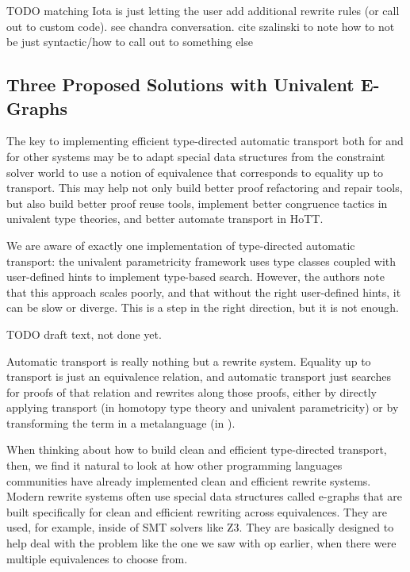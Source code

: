 TODO matching Iota is just letting the user add additional rewrite rules (or call out to custom code).
see chandra conversation.
cite szalinski to note how to not be just syntactic/how to call out to something else

\subsection{Three Proposed Solutions with Univalent E-Graphs}
\label{sec:egraph}



The key to implementing efficient type-directed automatic transport both for \toolname
and for other systems may be to adapt special data structures from the constraint solver world to use a
notion of equivalence that corresponds to equality up to transport.
This may help not only build better proof refactoring and repair tools, but also build better proof reuse tools,
implement better congruence tactics in univalent type theories, and better automate transport in HoTT.


We are aware of exactly one implementation of type-directed automatic transport:
the univalent parametricity framework uses type classes coupled with user-defined hints to implement type-based search.
However, the authors note that this approach scales poorly, and that without the right user-defined
hints, it can be slow or diverge.
This is a step in the right direction, but it is not enough.

TODO draft text, not done yet.

Automatic transport is really nothing but a rewrite system.
Equality up to transport is just an equivalence relation, and automatic transport just searches for proofs of that relation and rewrites along those proofs, either by directly applying transport (in homotopy type theory and univalent parametricity) or by transforming the term in a metalanguage (in \toolname).

When thinking about how to build clean and efficient type-directed transport, then, we find it natural to look
at how other programming languages communities have already implemented clean and efficient rewrite systems.
Modern rewrite systems often use special data structures called e-graphs that are built specifically
for clean and efficient rewriting across equivalences.
They are used, for example, inside of SMT solvers like Z3.
They are basically designed to help deal with the problem like the one we saw with op earlier, when there were multiple equivalences to 
choose from.

